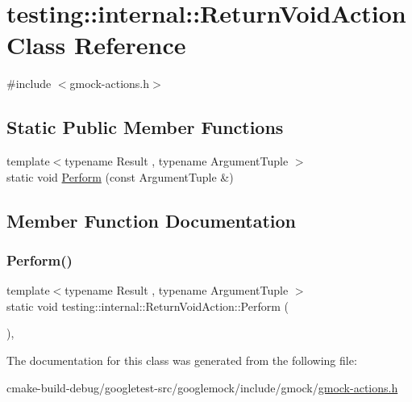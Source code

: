 \hypertarget{classtesting_1_1internal_1_1ReturnVoidAction}{}\section{testing\+::internal\+::Return\+Void\+Action Class Reference}
\label{classtesting_1_1internal_1_1ReturnVoidAction}


{\ttfamily \#include $<$gmock-\/actions.\+h$>$}

\subsection*{Static Public Member Functions}
\begin{DoxyCompactItemize}
\item 
{\footnotesize template$<$typename Result , typename Argument\+Tuple $>$ }\\static void \mbox{\hyperlink{classtesting_1_1internal_1_1ReturnVoidAction_ab9ea50ff501225b7510a623d0f0a405e}{Perform}} (const Argument\+Tuple \&)
\end{DoxyCompactItemize}


\subsection{Member Function Documentation}
\mbox{\label{classtesting_1_1internal_1_1ReturnVoidAction_ab9ea50ff501225b7510a623d0f0a405e}} 
\subsubsection{\texorpdfstring{Perform()}{Perform()}}
{\footnotesize\ttfamily template$<$typename Result , typename Argument\+Tuple $>$ \\
static void testing\+::internal\+::\+Return\+Void\+Action\+::\+Perform (\begin{DoxyParamCaption}\item[{const Argument\+Tuple \&}]{ }\end{DoxyParamCaption})\hspace{0.3cm}{\ttfamily [inline]}, {\ttfamily [static]}}



The documentation for this class was generated from the following file\+:\begin{DoxyCompactItemize}
\item 
cmake-\/build-\/debug/googletest-\/src/googlemock/include/gmock/\mbox{\hyperlink{gmock-actions_8h}{gmock-\/actions.\+h}}\end{DoxyCompactItemize}
